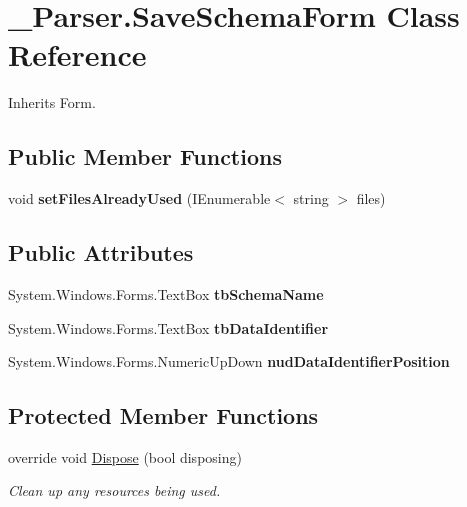\hypertarget{class__1920_parser_1_1_save_schema_form}{}\section{\+\_\+Parser.\+Save\+Schema\+Form Class Reference}
\label{class__1920_parser_1_1_save_schema_form}


Inherits Form.

\subsection*{Public Member Functions}
\begin{DoxyCompactItemize}
\item 
void {\bfseries set\+Files\+Already\+Used} (I\+Enumerable$<$ string $>$ files)\hypertarget{class__1920_parser_1_1_save_schema_form_a16d5555788d91934ca0e62f9e45fd21d}{}\label{class__1920_parser_1_1_save_schema_form_a16d5555788d91934ca0e62f9e45fd21d}

\end{DoxyCompactItemize}
\subsection*{Public Attributes}
\begin{DoxyCompactItemize}
\item 
System.\+Windows.\+Forms.\+Text\+Box {\bfseries tb\+Schema\+Name}\hypertarget{class__1920_parser_1_1_save_schema_form_ae4760769155fc202f53ea12b63d14633}{}\label{class__1920_parser_1_1_save_schema_form_ae4760769155fc202f53ea12b63d14633}

\item 
System.\+Windows.\+Forms.\+Text\+Box {\bfseries tb\+Data\+Identifier}\hypertarget{class__1920_parser_1_1_save_schema_form_a6b4727fdf859c257a72b637ffae15bdc}{}\label{class__1920_parser_1_1_save_schema_form_a6b4727fdf859c257a72b637ffae15bdc}

\item 
System.\+Windows.\+Forms.\+Numeric\+Up\+Down {\bfseries nud\+Data\+Identifier\+Position}\hypertarget{class__1920_parser_1_1_save_schema_form_afb1dbb18d04daa7d93d504ebf2b28dae}{}\label{class__1920_parser_1_1_save_schema_form_afb1dbb18d04daa7d93d504ebf2b28dae}

\end{DoxyCompactItemize}
\subsection*{Protected Member Functions}
\begin{DoxyCompactItemize}
\item 
override void \hyperlink{class__1920_parser_1_1_save_schema_form_aad5b4dd643ce36c4f44b98d98b2c3a06}{Dispose} (bool disposing)
\begin{DoxyCompactList}\small\item\em Clean up any resources being used. \end{DoxyCompactList}\end{DoxyCompactItemize}
